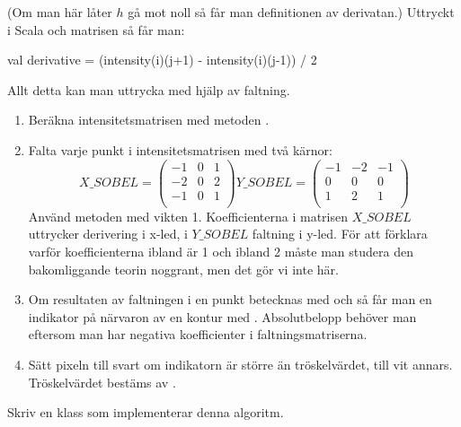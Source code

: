 (Om man här låter $h$ gå mot noll så får man definitionen av derivatan.) Uttryckt i Scala och matrisen  så får man:

\begin{Code}
val derivative = (intensity(i)(j+1) - intensity(i)(j-1)) / 2
\end{Code}

Allt detta kan man uttrycka med hjälp av faltning.

\begin{enumerate}
	\item Beräkna intensitetsmatrisen med metoden .
	\item Falta varje punkt i intensitetsmatrisen med två kärnor:
$$
X\_SOBEL =
\begin{pmatrix}
  -1 & 0 & 1 \\
  -2 & 0 & 2 \\
  -1 & 0 & 1 \\
\end{pmatrix}
Y\_SOBEL =
\begin{pmatrix}
  -1 & -2 & -1 \\
  0 & 0 & 0 \\
  1 & 2 & 1 \\
\end{pmatrix}
$$
	Använd metoden  med vikten 1. Koefficienterna i matrisen $X\_SOBEL$ uttrycker derivering i x-led, i $Y\_SOBEL$ faltning i y-led. För att förklara varför koefficienterna ibland är 1 och ibland 2 måste man studera den bakomliggande teorin noggrant, men det gör vi inte här.
	\item Om resultaten av faltningen i en punkt betecknas med  och  så får man en indikator på närvaron av en kontur med . Absolutbelopp behöver man eftersom man har negativa koefficienter i faltningsmatriserna.
	\item  Sätt pixeln till svart om indikatorn är större än tröskelvärdet, till vit annars. Tröskelvärdet bestäms av .
\end{enumerate}

Skriv en klass  som implementerar denna algoritm.

